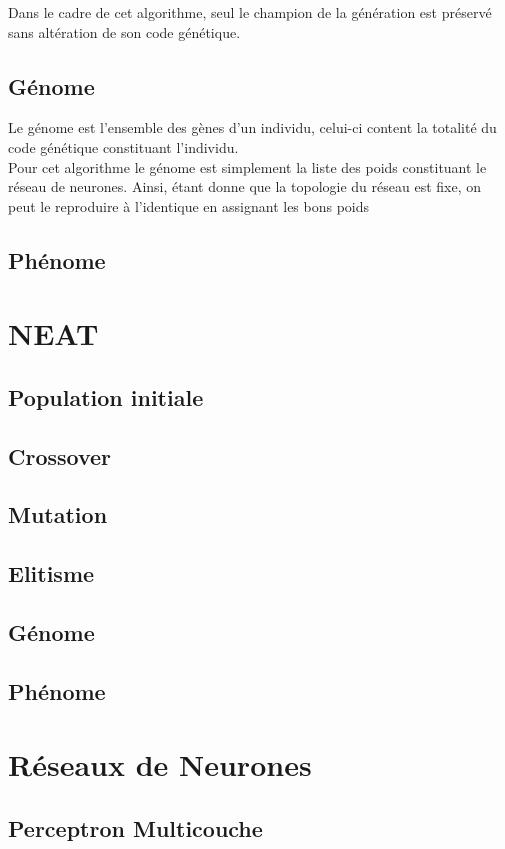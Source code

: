 \documentclass{article}
\begin{document}
Dans le cadre de cet algorithme, seul le champion de la génération est préservé sans altération de son code génétique.

\subsection{Génome}

Le génome est l'ensemble des gènes d'un individu, celui-ci content la totalité du code génétique constituant l'individu.\\
Pour cet algorithme le génome est simplement la liste des poids constituant le réseau de neurones. Ainsi, étant donne que la topologie du réseau est fixe, on peut le reproduire à l'identique en assignant les bons poids 

\subsection{Phénome}

\section{NEAT}

\subsection{Population initiale}
\subsection{Crossover}
\subsection{Mutation}
\subsection{Elitisme}
\subsection{Génome}
\subsection{Phénome}

\section{Réseaux de Neurones}
\subsection{Perceptron Multicouche}
\end{document}
